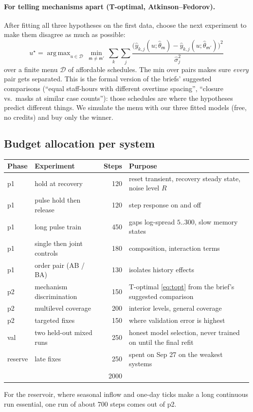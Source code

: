 \documentclass[11pt]{article}
\theoremstyle{plain}
\theoremstyle{definition}
\theoremstyle{remark}
\DeclareMathOperator*{\argmax}{arg\,max}
\begin{document}
\paragraph{For telling mechanisms apart (T-optimal, Atkinson--Fedorov).} After fitting all three hypotheses on the first data, choose the next experiment to make them disagree as much as possible:
\begin{equation}\label{eq:topt}
u^\star=\argmax_{u\in\mathcal D}\ \min_{\mathsf m\neq\mathsf m'}\ \sum_{k}\sum_j\frac{\big(\hat y_{k,j}(u;\hat\theta_{\mathsf m})-\hat y_{k,j}(u;\hat\theta_{\mathsf m'})\big)^2}{\hat\sigma_j^2}
\end{equation}
over a finite menu $\mathcal D$ of affordable schedules. The min over pairs makes sure \emph{every} pair gets separated. This is the formal version of the briefs' suggested comparisons (``equal staff-hours with different overtime spacing'', ``closure vs.\ masks at similar case counts''): those schedules are where the hypotheses predict different things. We simulate the menu with our three fitted models (free, no credits) and buy only the winner.

\subsection{Budget allocation per system}
\begin{center}
\small
\begin{tabular}{@{}llrp{7.8cm}@{}}
\toprule
Phase & Experiment & Steps & Purpose \\
\midrule
p1 & hold at recovery & 120 & reset transient, recovery steady state, noise level $R$ \\
p1 & pulse hold then release & 120 & step response on and off \\
p1 & long pulse train & 450 & gaps log-spread $5..300$, slow memory states \\
p1 & single then joint controls & 180 & composition, interaction terms \\
p1 & order pair (AB / BA) & 130 & isolates history effects \\
p2 & mechanism discrimination & 150 & T-optimal \eqref{eq:topt} from the brief's suggested comparison \\
p2 & multilevel coverage & 200 & interior levels, general coverage \\
p2 & targeted fixes & 150 & where validation error is highest \\
val & two held-out mixed runs & 250 & honest model selection, never trained on until the final refit \\
reserve & late fixes & 250 & spent on Sep 27 on the weakest systems \\
\midrule
 & & 2000 & \\
\bottomrule
\end{tabular}
\end{center}
For the reservoir, where seasonal inflow and one-day ticks make a long continuous run essential, one run of about 700 steps comes out of p2.
\end{document}
